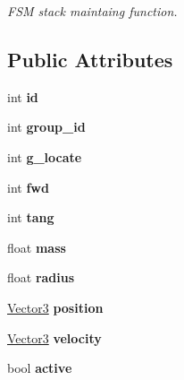 \begin{DoxyCompactItemize}
\begin{DoxyCompactList}\small\item\em F\+S\+M stack maintaing function. \end{DoxyCompactList}\end{DoxyCompactItemize}
\subsection*{Public Attributes}
\begin{DoxyCompactItemize}
\item 
\hypertarget{classbots_a4fb49114a690b168a733d87e46424f87}{int {\bfseries id}}\label{classbots_a4fb49114a690b168a733d87e46424f87}

\item 
\hypertarget{classbots_a93665bc265d99309b2d55df908557489}{int {\bfseries group\+\_\+id}}\label{classbots_a93665bc265d99309b2d55df908557489}

\item 
\hypertarget{classbots_a4b09c916cbb7c0037ac732e5698b4f13}{int {\bfseries g\+\_\+locate}}\label{classbots_a4b09c916cbb7c0037ac732e5698b4f13}

\item 
\hypertarget{classbots_abd45b3775c6656c9cd685e6bf51e86ef}{int {\bfseries fwd}}\label{classbots_abd45b3775c6656c9cd685e6bf51e86ef}

\item 
\hypertarget{classbots_ab977fb2bff23b95cd9bb426e3b1e81b4}{int {\bfseries tang}}\label{classbots_ab977fb2bff23b95cd9bb426e3b1e81b4}

\item 
\hypertarget{classbots_afa8c00def2a9a14c1444192fb9820eff}{float {\bfseries mass}}\label{classbots_afa8c00def2a9a14c1444192fb9820eff}

\item 
\hypertarget{classbots_aebde904e546d3ff52efc7f2b6dee2fc5}{float {\bfseries radius}}\label{classbots_aebde904e546d3ff52efc7f2b6dee2fc5}

\item 
\hypertarget{classbots_a4c0db530a0ceb2e5faf8fdf2268d0345}{\hyperlink{class_vector3}{Vector3} {\bfseries position}}\label{classbots_a4c0db530a0ceb2e5faf8fdf2268d0345}

\item 
\hypertarget{classbots_a8bc7711d8c7495f7eb0267a0bb89fea8}{\hyperlink{class_vector3}{Vector3} {\bfseries velocity}}\label{classbots_a8bc7711d8c7495f7eb0267a0bb89fea8}

\item 
\hypertarget{classbots_a88d7ac823cd725d345c606213cd5294f}{bool {\bfseries active}}\label{classbots_a88d7ac823cd725d345c606213cd5294f}


\end{DoxyCompactItemize}
